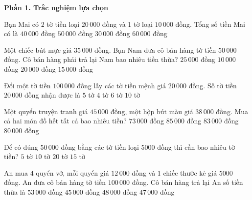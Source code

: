 \textbf{Phần 1. Trắc nghiệm lựa chọn}

\begin{ex} %
Bạn Mai có 2 tờ tiền loại $20\,000$ đồng và 1 tờ loại $10\,000$ đồng. Tổng số tiền Mai có là
\choice
{$40\,000$ đồng}
{\True $50\,000$ đồng}
{$30\,000$ đồng}
{$60\,000$ đồng}
\end{ex}

\begin{ex} %
Một chiếc bút mực giá $35\,000$ đồng. Bạn Nam đưa cô bán hàng tờ tiền $50\,000$ đồng. Cô bán hàng phải trả lại Nam bao nhiêu tiền thừa?
\choice
{$25\,000$ đồng}
{$10\,000$ đồng}
{$20\,000$ đồng}
{\True $15\,000$ đồng}
\end{ex}

\begin{ex} %
Đổi một tờ tiền $100\,000$ đồng lấy các tờ tiền mệnh giá $20\,000$ đồng. Số tờ tiền $20\,000$ đồng nhận được là
\choice
{\True $5$ tờ}
{$4$ tờ}
{$6$ tờ}
{$10$ tờ}
\end{ex}

\begin{ex} %
Một quyển truyện tranh giá $45\,000$ đồng, một hộp bút màu giá $38\,000$ đồng. Mua cả hai món đồ hết tất cả bao nhiêu tiền?
\choice
{$73\,000$ đồng}
{$85\,000$ đồng}
{\True $83\,000$ đồng}
{$80\,000$ đồng}
\end{ex}

\begin{ex} %
Để có đúng $50\,000$ đồng bằng các tờ tiền loại $5000$ đồng thì cần bao nhiêu tờ tiền?
\choice
{$5$ tờ}
{\True $10$ tờ}
{$20$ tờ}
{$15$ tờ}
\end{ex}

\begin{ex} %
An mua 4 quyển vở, mỗi quyển giá $12\,000$ đồng và 1 chiếc thước kẻ giá $5000$ đồng. An đưa cô bán hàng tờ tiền $100\,000$ đồng. Cô bán hàng trả lại An số tiền thừa là
\choice
{$53\,000$ đồng}
{$45\,000$ đồng}
{$48\,000$ đồng}
{\True $47\,000$ đồng}
\end{ex}

